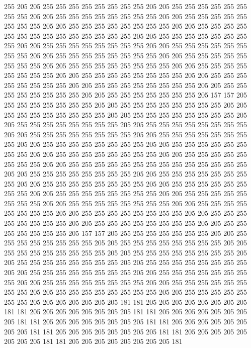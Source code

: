 255 205 205 255 255 255 255 255 255 255 255 205 205 255 255 255 255 255 255 255
255 205 205 255 255 255 255 255 255 255 255 205 205 255 255 255 255 255 255 255
255 205 205 255 255 255 255 255 255 255 255 205 205 255 255 255 255 255 255 255
255 255 255 255 255 255 255 205 205 255 255 255 255 255 255 255 255 205 205 255
255 255 255 255 255 255 255 205 205 255 255 255 255 255 255 255 255 205 205 255
255 255 255 255 255 255 255 205 205 255 255 255 255 255 255 255 255 205 205 255
255 255 255 255 255 255 255 205 205 255 255 255 255 255 255 255 255 205 205 255
255 255 255 255 255 255 255 205 205 255 255 255 255 255 255 255 255 205 205 255
255 255 255 255 255 255 255 205 205 255 255 255 255 255 255 255 255 205 205 255
255 255 255 255 255 255 205 157 157 205 255 255 255 255 255 255 255 205 205 255
255 255 255 255 255 255 255 205 205 255 255 255 255 255 255 255 255 205 205 255
255 255 255 255 255 255 255 205 205 255 255 255 255 255 255 255 255 205 205 255
255 255 255 255 255 255 255 205 205 255 255 255 255 255 255 255 255 205 205 255
255 255 255 255 255 255 255 205 205 255 255 255 255 255 255 255 255 205 205 255
255 255 255 255 255 255 255 205 205 255 255 255 255 255 255 255 255 205 205 255
255 255 255 255 255 255 255 205 205 255 255 255 255 255 255 255 255 255 255 255
255 255 255 205 205 255 255 255 255 255 255 255 255 205 205 255 255 255 255 255
255 255 255 205 205 255 255 255 255 255 255 255 255 205 205 255 255 255 255 255
255 255 255 205 205 255 255 255 255 255 255 255 255 205 205 255 255 255 255 255
255 255 255 205 205 255 255 255 255 255 255 255 255 205 205 255 255 255 255 255
255 255 255 205 205 255 255 255 255 255 255 255 255 205 205 255 255 255 255 255
255 255 255 205 205 255 255 255 255 255 255 255 255 205 205 255 255 255 255 255
255 255 205 157 157 205 255 255 255 255 255 255 255 205 205 255 255 255 255 255
255 255 255 205 205 255 255 255 255 255 255 255 255 205 205 255 255 255 255 255
255 255 255 205 205 255 255 255 255 255 255 255 255 205 205 255 255 255 255 255
255 255 255 205 205 255 255 255 255 255 255 255 255 205 205 255 255 255 255 255
255 255 255 205 205 255 255 255 255 255 255 255 255 205 205 255 255 255 255 255
255 255 255 205 205 255 255 255 255 255 255 255 255 205 205 255 255 255 255 255
255 255 255 205 205 255 255 255 255 255 255 255 205 205 205 205 205 205 205 181
181 205 205 205 205 205 205 205 205 181 181 205 205 205 205 205 205 205 205 181
181 205 205 205 205 205 205 205 205 181 181 205 205 205 205 205 205 205 205 181
181 205 205 205 205 205 205 205 205 181 181 205 205 205 205 205 205 205 205 181
181 205 205 205 205 205 205 205 205 181 181 205 205 205 205 205 205 205 205 181
